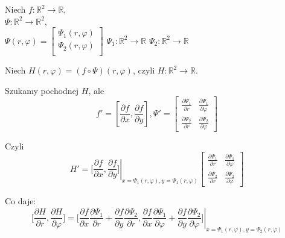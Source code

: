 \documentclass[../main.tex]{subfiles}
\begin{document}
\begin{przyklad}
Niech $f: \mathbb{R}^2 \to \mathbb{R}$, \\
    $\Psi: \mathbb{R}^2 \to \mathbb{R}^2$,\\
    $\Psi(r,\varphi) = \left [ \begin{matrix} \Psi_1(r,\varphi)\\ \Psi_2(r,\varphi)\\\end{matrix}\right ]$
$\Psi_1: \mathbb{R}^2 \to \mathbb{R}$
$\Psi_2: \mathbb{R}^2 \to \mathbb{R}$

\vspace{0.3cm}
Niech $H(r,\varphi) = (f \circ \Psi) (r, \varphi)$, czyli $H : \mathbb{R}^2 \to \mathbb{R}$.

Szukamy pochodnej $H$, ale
    \[
        f' = [\frac{\partial f}{\partial x} , \frac{\partial f}{\partial y} ], \Psi ' = \left [ \begin{matrix}
\frac{\partial \Psi_1}{\partial r}  &\frac{\partial \Psi_1}{\partial \varphi} \\
\frac{\partial \Psi_2}{\partial r}  &\frac{\partial \Psi_2}{\partial \varphi}
        \end{matrix}\right ]
    \]

Czyli
    \[
        H' = \left . \Big [ \frac{\partial f}{\partial x} , \frac{\partial f}{\partial y} \Big ] \right |_{x=\Psi_1(r,\varphi), y=\Psi_1(r,\varphi)} \left [ \begin{matrix}
\frac{\partial \Psi_1}{\partial r}  &\frac{\partial \Psi_1}{\partial \varphi} \\
\frac{\partial \Psi_2}{\partial r}  &\frac{\partial \Psi_2}{\partial \varphi}
        \end{matrix}\right ]
    \]

Co daje:
    \[
        \left . \Big [ \frac{\partial H}{\partial r} , \frac{\partial H}{\partial \varphi} \Big ] = \Big [ \frac{\partial f}{\partial x} \frac{\partial \Psi_1}{\partial r} + \frac{\partial f}{\partial y} \frac{\partial \Psi_2}{\partial r} , \frac{\partial f}{\partial x} \frac{\partial \Psi_1}{\partial \varphi} + \frac{\partial f}{\partial y} \frac{\partial \Psi_2}{\partial \varphi} \Big ] \right |_{x = \Psi_1 (r,\varphi), y = \Psi_2 (r,\varphi)}
    \]
\end{przyklad}
\end{document}
